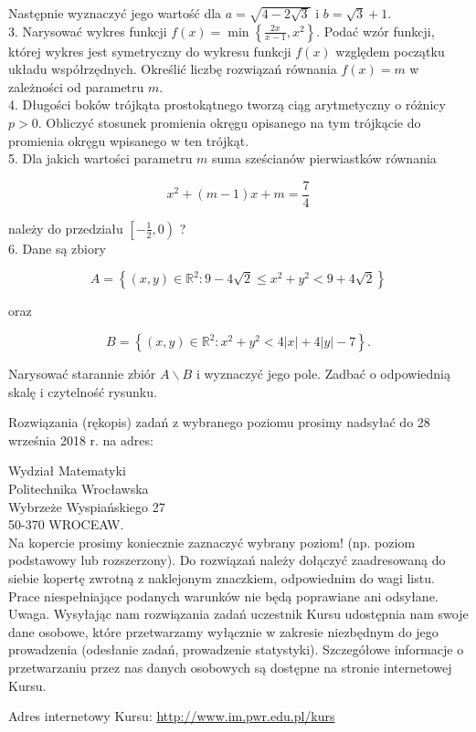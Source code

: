 \documentclass[10pt]{article}
\begin{document}
Następnie wyznaczyć jego wartość dla $a=\sqrt{4-2 \sqrt{3}}$ i $b=\sqrt{3}+1$.\\
3. Narysować wykres funkcji $f(x)=\min \left\{\frac{2 x}{x-1}, x^{2}\right\}$. Podać wzór funkcji, której wykres jest symetryczny do wykresu funkcji $f(x)$ względem początku układu współrzędnych. Określić liczbę rozwiązań równania $f(x)=m$ w zależności od parametru $m$.\\
4. Długości boków trójkąta prostokątnego tworzą ciąg arytmetyczny o różnicy $p>0$. Obliczyć stosunek promienia okręgu opisanego na tym trójkącie do promienia okręgu wpisanego w ten trójkąt.\\
5. Dla jakich wartości parametru $m$ suma sześcianów pierwiastków równania

$$
x^{2}+(m-1) x+m=\frac{7}{4}
$$

należy do przedziału $\left[-\frac{1}{2}, 0\right)$ ?\\
6. Dane są zbiory

$$
A=\left\{(x, y) \in \mathbb{R}^{2}: 9-4 \sqrt{2} \leqslant x^{2}+y^{2}<9+4 \sqrt{2}\right\}
$$

oraz

$$
B=\left\{(x, y) \in \mathbb{R}^{2}: x^{2}+y^{2}<4|x|+4|y|-7\right\} .
$$

Narysować starannie zbiór $A \backslash B$ i wyznaczyć jego pole. Zadbać o odpowiednią skalę i czytelność rysunku.

Rozwiązania (rękopis) zadań z wybranego poziomu prosimy nadsyłać do 28 września 2018 r. na adres:

Wydział Matematyki\\
Politechnika Wrocławska\\
Wybrzeże Wyspiańskiego 27\\
50-370 WROCEAW.\\
Na kopercie prosimy koniecznie zaznaczyć wybrany poziom! (np. poziom podstawowy lub rozszerzony). Do rozwiązań należy dołączyć zaadresowaną do siebie kopertę zwrotną z naklejonym znaczkiem, odpowiednim do wagi listu. Prace niespełniające podanych warunków nie będą poprawiane ani odsyłane.\\
Uwaga. Wysyłając nam rozwiązania zadań uczestnik Kursu udostępnia nam swoje dane osobowe, które przetwarzamy wyłącznie w zakresie niezbędnym do jego prowadzenia (odesłanie zadań, prowadzenie statystyki). Szczegółowe informacje o przetwarzaniu przez nas danych osobowych są dostępne na stronie internetowej Kursu.

Adres internetowy Kursu: \href{http://www.im.pwr.edu.pl/kurs}{http://www.im.pwr.edu.pl/kurs}
\end{document}
